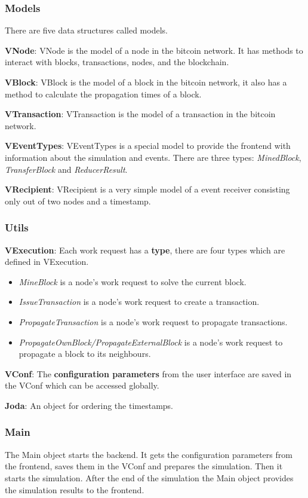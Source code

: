 \subsubsection{Models}
There are five data structures called models.

\textbf{VNode}: VNode is the model of a node in the bitcoin network. It has methods to interact with blocks, transactions, nodes, and the blockchain.

\textbf{VBlock}: VBlock is the model of a block in the bitcoin network, it also has a method to calculate the propagation times of a block.

\textbf{VTransaction}: VTransaction is the model of a transaction in the bitcoin network.

\textbf{VEventTypes}: VEventTypes is a special model to provide the frontend with information about the simulation and events. There are three types: \textit{MinedBlock}, \textit{TransferBlock} and \textit{ReducerResult}.

\textbf{VRecipient}: VRecipient is a very simple model of a event receiver consisting only out of two nodes and a timestamp.

\subsubsection{Utils}
\textbf{VExecution}: Each work request has a \textbf{type}, there are four types which are defined in VExecution. 

\begin{itemize}
\item \textit{MineBlock} is a node's work request to solve the current block. 
\item \textit{IssueTransaction} is a node's work request to create a transaction. 
\item \textit{PropagateTransaction} is a node's work request to propagate transactions.
\item \textit{PropagateOwnBlock/PropagateExternalBlock} is a node's work request to propagate a block to its neighbours.
\end{itemize} 

\textbf{VConf}: The \textbf{configuration parameters} from the user interface are saved in the VConf which can be accessed globally.

\textbf{Joda}: An object for ordering the timestamps.

\subsubsection{Main}
The Main object starts the backend. It gets the configuration parameters from the frontend, saves them in the VConf and prepares the simulation. Then it starts the simulation. After the end of the simulation the Main object provides the simulation results to the frontend.

